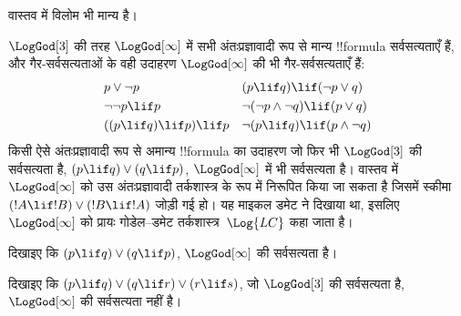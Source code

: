 \documentclass[../../../include/open-logic-section]{subfiles}
\begin{document}
वास्तव में विलोम भी मान्य है।

$\LogGod[3]$ की तरह $\LogGod[\infty]$ में सभी अंतःप्रज्ञावादी रूप से मान्य
!!{formula} सर्वसत्यताएँ हैं, और गैर-सर्वसत्यताओं के वही उदाहरण
$\LogGod[\infty]$ की भी गैर-सर्वसत्यताएँ हैं:
\begin{align*}
  & p \lor \lnot p && (p \lif q) \lif (\lnot p \lor q) \\
  & \lnot\lnot p \lif p && \lnot(\lnot p \land \lnot q) \lif (p \lor q) \\
  & ((p \lif q) \lif p) \lif p && \lnot(p \lif q) \lif (p \land \lnot q)
\end{align*}
किसी ऐसे अंतःप्रज्ञावादी रूप से अमान्य !!{formula} का उदाहरण जो फिर भी
$\LogGod[3]$ की सर्वसत्यता है, $(p \lif q) \lor (q \lif p)$,
$\LogGod[\infty]$ में भी सर्वसत्यता है। वास्तव में $\LogGod[\infty]$ को
उस अंतःप्रज्ञावादी तर्कशास्त्र के रूप में निरूपित किया जा सकता है जिसमें
स्कीमा $(!A \lif !B) \lor (!B \lif !A)$ जोड़ी गई हो। यह माइकल डमेट ने
दिखाया था, इसलिए $\LogGod[\infty]$ को प्रायः गोडेल--डमेट
तर्कशास्त्र~$\Log{LC}$ कहा जाता है।

\begin{prob}
  दिखाइए कि $(p \lif q) \lor (q \lif p)$, $\LogGod[\infty]$ की सर्वसत्यता
  है।
\end{prob}

\begin{prob}
  दिखाइए कि $(p \lif q) \lor (q \lif r) \lor (r \lif s)$, जो
  $\LogGod[3]$ की सर्वसत्यता है, $\LogGod[\infty]$ की सर्वसत्यता नहीं है।
\end{prob}
\end{document}
